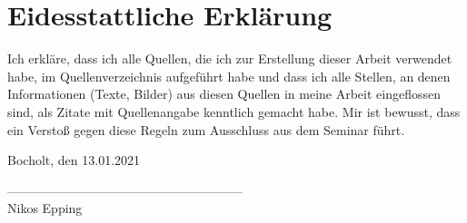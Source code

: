 \section{Eidesstattliche Erklärung}
Ich erkläre, dass ich alle Quellen, die ich zur Erstellung dieser Arbeit verwendet habe, im Quellenverzeichnis aufgeführt habe und dass ich alle Stellen, an denen Informationen (Texte, Bilder) aus diesen Quellen in meine Arbeit eingeflossen sind, als Zitate mit Quellenangabe kenntlich gemacht habe.
Mir ist bewusst, dass ein Verstoß gegen diese Regeln zum Ausschluss aus dem Seminar führt.

\vspace{1.5cm}

\small
Bocholt, den 13.01.2021

\vspace{0.8cm}

--------------------------------------------------------\\
Nikos Epping